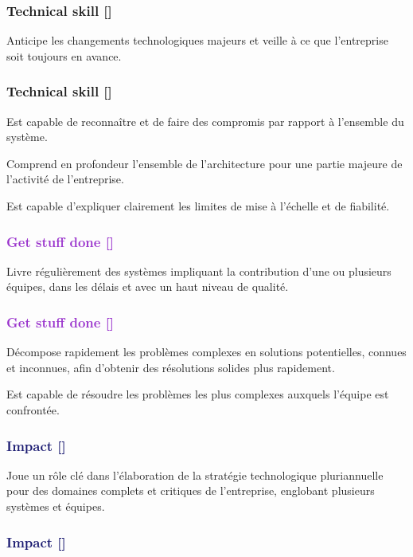 \documentclass[a4paper, french, openany, 12pt]{book}
\newcommand\dex{\textcolor{BrickRed}{\textbf{Technical skill [\bsc{DEX}]}}}
\newcommand\str{\textcolor{DarkOrchid}{\textbf{Get stuff done [\bsc{STR}]}}}
\newcommand\wis{\textcolor{MidnightBlue}{\textbf{Impact [\bsc{WIS}]}}}
\begin{document}
\begin{multicols}{2}

  \subsubsection*{\dex}

  Anticipe les changements technologiques majeurs et veille à ce que l'entreprise soit toujours en avance.

  \subsubsection*{\dex}
  Est capable de reconnaître et de faire des compromis par rapport à l'ensemble du système.

  Comprend en profondeur l'ensemble de l'architecture pour une partie majeure de l'activité de l'entreprise.

  Est capable d'expliquer clairement les limites de mise à l'échelle et de fiabilité.

  \subsubsection*{\str}

  Livre régulièrement des systèmes impliquant la contribution d'une ou plusieurs équipes, dans les délais et avec un haut 
  niveau de qualité.

  \subsubsection*{\str}

  Décompose rapidement les problèmes complexes en solutions potentielles, connues et inconnues, afin d'obtenir des 
  résolutions solides plus rapidement.

  Est capable de résoudre les problèmes les plus complexes auxquels l'équipe est confrontée.

  \subsubsection*{\wis}

  Joue un rôle clé dans l'élaboration de la stratégie technologique pluriannuelle pour des domaines complets et critiques 
  de l'entreprise, englobant plusieurs systèmes et équipes.

  \subsubsection*{\wis}


\end{multicols}
\end{document}
